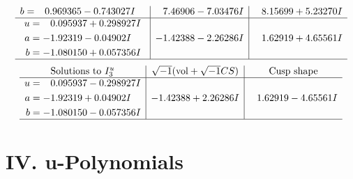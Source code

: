 \documentclass[1p]{elsarticle_modified}
\theoremstyle{definition}
\newcommand{\I}{\sqrt{-1}}
\begin{document}
$$\begin{array}{c|c|c}
\begin{aligned}
b &= \phantom{-}0.969365 - 0.743027 I\end{aligned}
 & \phantom{-}7.46906 - 7.03476 I & \phantom{-}8.15699 + 5.23270 I \\ \hline\begin{aligned}
u &= \phantom{-}0.095937 + 0.298927 I \\
a &= -1.92319 - 0.04902 I \\
b &= -1.080150 + 0.057356 I\end{aligned}
 & -1.42388 - 2.26286 I & \phantom{-}1.62919 + 4.65561 I\\
 \hline 
 \end{array}$$\newpage$$\begin{array}{c|c|c}  
\text{Solutions to }I^u_{3}& \I (\text{vol} + \sqrt{-1}CS) & \text{Cusp shape}\\
 \hline 
\begin{aligned}
u &= \phantom{-}0.095937 - 0.298927 I \\
a &= -1.92319 + 0.04902 I \\
b &= -1.080150 - 0.057356 I\end{aligned}
 & -1.42388 + 2.26286 I & \phantom{-}1.62919 - 4.65561 I\\
 \hline 
 \end{array}$$\newpage
\newpage\renewcommand{\arraystretch}{1}
\centering \section*{ IV. u-Polynomials}
\end{document}
